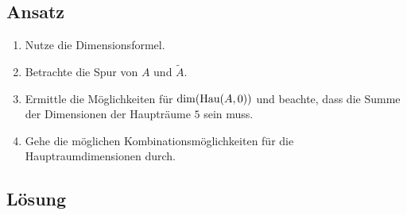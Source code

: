 \subsection{Ansatz}
\begin{enumerate}
	\item Nutze die Dimensionsformel.
	\item Betrachte die Spur von \( A \) und \( \widetilde{A} \).
	\item Ermittle die Möglichkeiten für \( \dim(\text{Hau}(A,0)) \) und beachte, dass die Summe der Dimensionen der Haupträume \( 5 \) sein muss.
	\item Gehe die möglichen Kombinationsmöglichkeiten für die Hauptraumdimensionen durch. 
\end{enumerate}

\subsection{Lösung}
